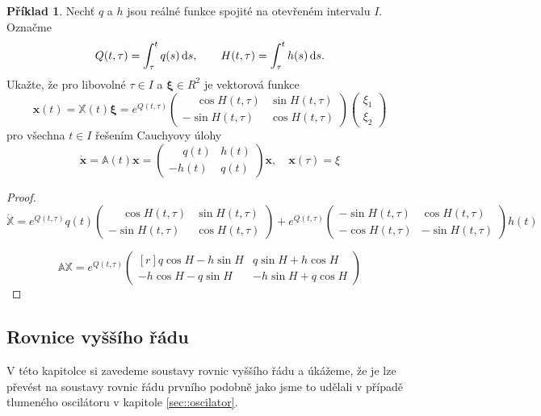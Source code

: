 \documentclass[a4paper, 12pt]{book}
\theoremstyle{definition}
\newtheorem{example}[theorem]{Příklad}
\def\d{\,{\rm d}}               %
\def\vc#1{\mathbf{\boldsymbol{#1}}}     %
\def\tn#1{{\mathbb{#1}}}    %
\begin{document}
\begin{example}
Nechť $q$ a $h$ jsou reálné funkce spojité na otevřeném intervalu $I$.
Označme
\[
    Q(t,\tau) = \int_\tau^t q(s)\d s,\qquad 
    H(t,\tau) = \int_\tau^t h(s)\d s.
\]
Ukažte, že pro libovolné $\tau\in I$ a $\vc \xi \in R^2$ je vektorová 
funkce
\[
\vc x(t) = \tn X(t) \vc \xi = e^{Q(t,\tau)}
\begin{pmatrix}
\phantom{-}\cos H(t,\tau)  & \sin H(t,\tau)\\
-\sin H(t,\tau) & \cos H(t,\tau)
\end{pmatrix} 
\begin{pmatrix}
 \xi_1 \\
 \xi_2
\end{pmatrix}
\]
pro všechna $t\in I$ řešením Cauchyovy úlohy
\[
 \dot{\vc x} = \tn A(t) \vc x = 
 \begin{pmatrix}
  \phantom{-}q(t) & h(t) \\
  -h(t) & q(t)
 \end{pmatrix}
 \vc x,
 \quad \vc x(\tau) = \xi
\]
\end{example}
\begin{proof}
\[
 \dot{\tn X} = e^{Q(t,\tau)} q(t)
\begin{pmatrix}
\phantom{-}\cos H(t,\tau)  & \sin H(t,\tau)\\
-\sin H(t,\tau) & \cos H(t,\tau)
\end{pmatrix} 
+
e^{Q(t,\tau)} 
\begin{pmatrix}
-\sin H(t,\tau)  & \cos H(t,\tau)\\
-\cos H(t,\tau) & -\sin H(t,\tau)
\end{pmatrix}
h(t)
\]

\[
 \tn A \tn X =  e^{Q(t,\tau)} 
\begin{pmatrix*}[r]
q \cos H - h \sin H   &  q \sin H + h \cos H \\
-h \cos H - q \sin H   &  -h \sin H + q \cos H
\end{pmatrix*} 
\]

\end{proof}

\subsection{Rovnice vyššího řádu}
V této kapitolce si zavedeme soustavy rovnic vyššího řádu a úkážeme, že je lze převést na 
soustavy rovnic řádu prvního podobně jako jsme to udělali v případě tlumeného oscilátoru 
v kapitole \ref{sec::oscilator}.
\end{document}
